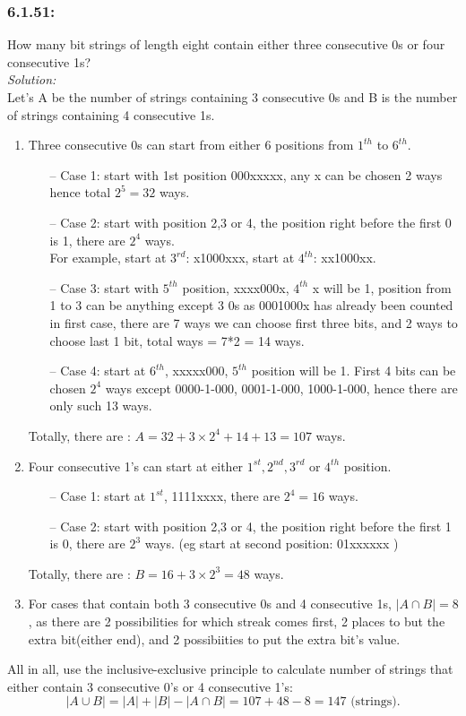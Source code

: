 \documentclass[a4paper]{article}
\begin{document}
	\subsubsection*{6.1.51:}How many bit strings of length eight contain either three consecutive 0s or four consecutive 1s?\\
	\textit{Solution:} \\
	Let's A be the number of strings containing 3 consecutive 0s and B is the number of strings containing 4 consecutive 1s.
	\begin{enumerate} 
	    \item Three consecutive 0s can start from either 6 positions from $1^{th}$ to $6^{th}$.
	    \begin{itemize} 
	        \item[--] Case 1: start with 1st position 000xxxxx, any x can be chosen 2 ways hence total $2^5=32$ ways.
	        \item[--] Case 2: start with position 2,3 or 4, the position right before the first 0 is 1, there are $2^{4} $ ways. \\
	        For example, start at $3^{rd}$: x1000xxx, start at $4^{th}$: xx1000xx.
	        \item[--] Case 3: start with $5^{th}$ position, xxxx000x, $4^{th}$ x will be 1, position from 1 to 3 can be anything except 3 0s as 0001000x has already been counted in first case, there are 7 ways we can choose first three bits, and 2 ways to choose last 1 bit, total ways = 7*2 = 14 ways.
	        \item[--] Case 4: start at $6^{th}$, xxxxx000, $5^{th}$ position will be 1. First 4 bits can be chosen $2^4$ ways except 0000-1-000, 0001-1-000, 1000-1-000, hence there are only such 13 ways.
	    \end{itemize}
	    Totally, there are : $A= 32 + 3\times 2^{4} + 14+ 13 = 107$ ways.
	    \item Four consecutive 1's can start at either $1^{st},2^{nd},3^{rd}$ or $4^{th}$ position.
	    \begin{itemize}
	        \item[--] Case 1: start at $1^{st}$, 1111xxxx, there are $2^4 = 16$ ways.
	        \item[--] Case 2: start with position 2,3 or 4, the position right before the first 1 is 0, there are $2^{3} $ ways. (eg start at second position: 01xxxxxx )
	    \end{itemize}
	    Totally, there are : $B = 16 + 3\times 2^{3} = 48 $ ways.
	    \item For cases that contain both 3 consecutive 0s and 4 consecutive 1s, $|A \cap B| = 8$, as there are 2 possibilities for which streak comes first, 2 places to but the extra bit(either end), and 2 possibiities to put the extra bit's value.
	\end{enumerate}
	All in all, use the inclusive-exclusive principle to calculate number of strings that either contain 3 consecutive 0's or 4 consecutive 1's:
	\begin{equation*}
	    |A \cup B| = |A| + |B| - |A \cap B| = 107 + 48 - 8 = 147 \text{ (strings).}
	\end{equation*}
\end{document}
